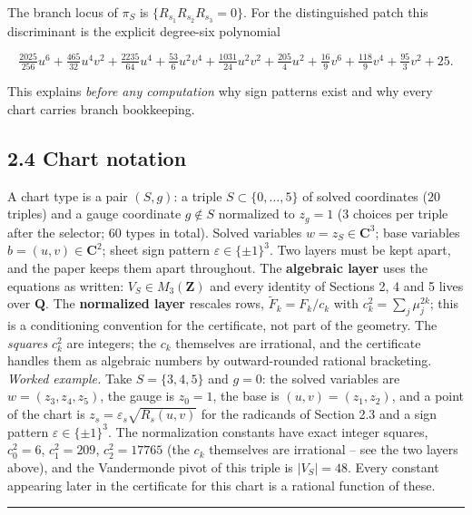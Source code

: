 The branch locus of \(\pi_S\) is \(\{R_{s_1} R_{s_2} R_{s_3} = 0\}\). For the distinguished patch this discriminant is the explicit degree-six polynomial

\[
\tfrac{2025}{256}u^6 + \tfrac{465}{32}u^4v^2 + \tfrac{2235}{64}u^4
+ \tfrac{53}{6}u^2v^4 + \tfrac{1031}{24}u^2v^2 + \tfrac{205}{4}u^2
+ \tfrac{16}{9}v^6 + \tfrac{118}{9}v^4 + \tfrac{95}{3}v^2 + 25 .
\]

This explains \emph{before any computation} why sign patterns exist and why every chart carries branch bookkeeping.

\subsection{2.4 Chart notation}\label{chart-notation}

A chart type is a pair \((S, g)\): a triple \(S \subset \{0, \dots, 5\}\) of solved coordinates (\(20\) triples) and a gauge coordinate \(g \notin S\) normalized to \(z_g = 1\) (\(3\) choices per triple after the selector; \(60\) types in total). Solved variables \(w = z_S \in \mathbf{C}^3\); base variables \(b = (u, v) \in \mathbf{C}^2\); sheet sign pattern \(\varepsilon \in \{\pm 1\}^3\). Two layers must be kept apart, and the paper keeps them apart throughout. The \textbf{algebraic layer} uses the equations as written: \(V_S \in M_3(\mathbf{Z})\) and every identity of Sections 2, 4 and 5 lives over \(\mathbf{Q}\). The \textbf{normalized layer} rescales rows, \(\tilde F_k = F_k / c_k\) with \(c_k^2 = \sum_j \mu_j^{2k}\); this is a conditioning convention for the certificate, not part of the geometry. The \emph{squares} \(c_k^2\) are integers; the \(c_k\) themselves are irrational, and the certificate handles them as algebraic numbers by outward-rounded rational bracketing. \emph{Worked example.} Take \(S = \{3,4,5\}\) and \(g = 0\): the solved variables are \(w = (z_3, z_4, z_5)\), the gauge is \(z_0 = 1\), the base is \((u, v) = (z_1, z_2)\), and a point of the chart is \(z_s = \varepsilon_s \sqrt{R_s(u,v)}\) for the radicands of Section 2.3 and a sign pattern \(\varepsilon \in \{\pm 1\}^3\). The normalization constants have exact integer squares, \(c_0^2 = 6\), \(c_1^2 = 209\), \(c_2^2 = 17765\) (the \(c_k\) themselves are irrational -- see the two layers above), and the Vandermonde pivot of this triple is \(|V_S| = 48\). Every constant appearing later in the certificate for this chart is a rational function of these.

\begin{center}\rule{\linewidth}{0.5pt}\end{center}

